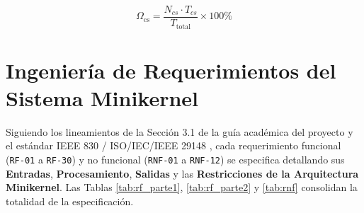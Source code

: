 \documentclass[10pt,twocolumn,letterpaper]{article}
\begin{document}
\begin{equation}
  \Omega_{\text{cs}} = \frac{N_{cs} \cdot T_{cs}}{T_{\text{total}}} \times 100\%
  \label{eq:cpu_ovh}
\end{equation}

\section{Ingenier\'ia de Requerimientos del Sistema Minikernel}

Siguiendo los lineamientos de la Secci\'on 3.1 de la gu\'ia acad\'emica del proyecto y el est\'andar IEEE 830 / ISO/IEC/IEEE 29148 \cite{ieee29148}, cada requerimiento funcional (\texttt{RF-01} a \texttt{RF-30}) y no funcional (\texttt{RNF-01} a \texttt{RNF-12}) se especifica detallando sus \textbf{Entradas}, \textbf{Procesamiento}, \textbf{Salidas} y las \textbf{Restricciones de la Arquitectura Minikernel}. Las Tablas \ref{tab:rf_parte1}, \ref{tab:rf_parte2} y \ref{tab:rnf} consolidan la totalidad de la especificaci\'on.
\end{document}
